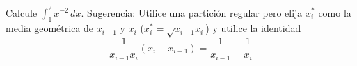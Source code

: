 \item Calcule $\int_1^2 x^{-2} \, dx$. Sugerencia: Utilice una partición regular pero elija $x_i^*$ como la media geométrica de $x_{i-1}$ y $x_i$ ($x_i^* = \sqrt{x_{i-1}x_i}$) y utilice la identidad
$$\frac{1}{x_{i-1}x_i}(x_i - x_{i-1}) = \frac{1}{x_{i-1}} - \frac{1}{x_i}$$

